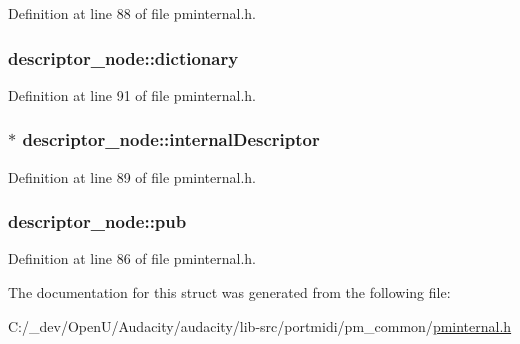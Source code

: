Definition at line 88 of file pminternal.\+h.

\subsubsection[{\texorpdfstring{dictionary}{dictionary}}]{ descriptor\+\_\+node\+::dictionary}\hypertarget{structdescriptor__node_a79791dac344af440b10af2ab9cee26e3}{}\label{structdescriptor__node_a79791dac344af440b10af2ab9cee26e3}


Definition at line 91 of file pminternal.\+h.

\subsubsection[{\texorpdfstring{internal\+Descriptor}{internalDescriptor}}]{$\ast$ descriptor\+\_\+node\+::internal\+Descriptor}\hypertarget{structdescriptor__node_a5e90cf08a561afbc02fa8ac72264bb9a}{}\label{structdescriptor__node_a5e90cf08a561afbc02fa8ac72264bb9a}


Definition at line 89 of file pminternal.\+h.

\subsubsection[{\texorpdfstring{pub}{pub}}]{ descriptor\+\_\+node\+::pub}\hypertarget{structdescriptor__node_a63b20f87d756eab969d3352103322516}{}\label{structdescriptor__node_a63b20f87d756eab969d3352103322516}


Definition at line 86 of file pminternal.\+h.



The documentation for this struct was generated from the following file\+:\begin{DoxyCompactItemize}
\item 
C\+:/\+\_\+dev/\+Open\+U/\+Audacity/audacity/lib-\/src/portmidi/pm\+\_\+common/\hyperlink{pminternal_8h}{pminternal.\+h}\end{DoxyCompactItemize}
